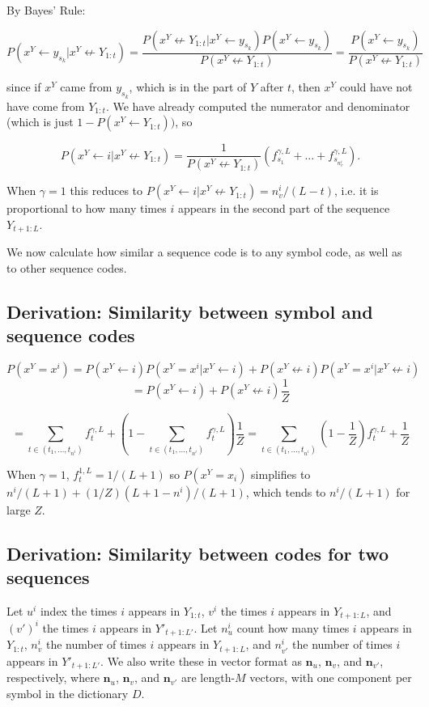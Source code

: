 \documentclass{article}
\begin{document}
\begin{appendices}
By Bayes' Rule:

$$P(x^Y \leftarrow y_{s_k}| x^Y \not \leftarrow Y_{1:t}) = \frac{P(x^Y \not \leftarrow Y_{1:t}| x^Y \leftarrow y_{s_k})P(x^Y \leftarrow y_{s_k})}{P(x^Y \not\leftarrow Y_{1:t})} = \frac{P(x^Y \leftarrow y_{s_k})}{P(x^Y \not\leftarrow Y_{1:t})}$$

since if $x^Y$ came from $y_{s_k}$, which is in the part of $Y$ after $t$, then $x^Y$ could have not have come from $Y_{1:t}$. We have already computed the numerator and denominator (which is just $1 - P(x^Y \leftarrow Y_{1:t}))$, so

$$P(x^Y \leftarrow i|x^Y \not \leftarrow Y_{1:t}) = \frac{1}{P(x^Y \not\leftarrow Y_{1:t})}\left( f^{\gamma,L}_{s_1} + ... + f^{\gamma,L}_{s_{n^i_v}} \right).$$

When $\gamma = 1$ this reduces to $P(x^Y \leftarrow i|x^Y \not \leftarrow Y_{1:t}) = n^i_v/(L-t)$, i.e. it is proportional to how many times $i$ appears in the second part of the sequence $Y_{t+1:L}$.

We now calculate how similar a sequence code is to any symbol code, as well as to other sequence codes.

\subsection{Derivation: Similarity between symbol and sequence codes}

$$P(x^Y = x^i) = P(x^Y \leftarrow i)P(x^Y = x^i|x^Y \leftarrow i) + P(x^Y \not \leftarrow i)P(x^Y = x^i|x^Y \not \leftarrow i)
$$
$$= P(x^Y \leftarrow i) + P(x^Y \not \leftarrow i)\frac{1}{Z}$$

$$= \sum\limits_{t \in (t_1, ..., t_{n^i})}f^{\gamma,L}_t + \left(1 - \sum\limits_{t \in (t_1, ..., t_{n^i})}f^{\gamma,L}_t\right)\frac{1}{Z}
= \sum\limits_{t \in (t_1, ..., t_{n^i})}\left(1 - \frac{1}{Z}\right)f^{\gamma,L}_t + \frac{1}{Z}$$

When $\gamma = 1$, $f_t^{1,L} = 1/(L+1)$ so $P(x^Y = x_i)$ simplifies to $n^i/(L+1) + (1/Z)(L+1-n^i)/(L+1)$, which tends to  $n^i/(L+1)$ for large $Z$.

\subsection{Derivation: Similarity between codes for two sequences}

Let $u^i$ index the times $i$ appears in $Y_{1:t}$, $v^i$ the times $i$ appears in $Y_{t+1:L}$, and $(v')^i$ the times $i$ appears in $Y'_{t+1:L'}$. Let $n^i_u$ count how many times $i$ appears in $Y_{1:t}$, $n^i_v$ the number of times $i$ appears in $Y_{t+1:L}$, and $n^i_{v'}$ the number of times $i$ appears in $Y'_{t+1:L'}$. We also write these in vector format as $\mathbf{n}_u$, $\mathbf{n}_v$, and $\mathbf{n}_{v'}$, respectively, where $\mathbf{n}_u$, $\mathbf{n}_v$, and $\mathbf{n}_{v'}$ are length-$M$ vectors, with one component per symbol in the dictionary $D$.


\end{appendices}
\end{document}
